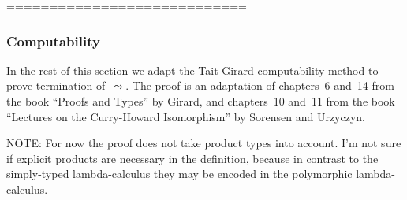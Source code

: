 \documentclass[runningheads,a4paper]{llncs}
\newcommand{\arrtype}{\Rightarrow}
\newcommand{\arreta}{\leadsto_\eta}
\newcommand{\arrnormalise}{\leadsto}
\newcommand{\normstep}{\leadsto_\mu}
\newcommand{\abs}[2]{\lambda #1.#2}
\newcommand{\app}[2]{#1 \cdot #2}
\newcommand{\apps}[3]{#1 \cdot #2 \cdots #3}
\newcommand{\nat}{\mathtt{nat}}
\newcommand{\SN}{\mathrm{SN}}
\newcommand{\Nbb}{\mathbb{N}}
\newcommand{\proves}{\vdash}
\begin{document}
%
%

============================


\subsubsection{Computability}
In the rest of this section we adapt the Tait-Girard computability
method to prove termination of~$\arrnormalise$. The proof is an
adaptation of chapters~6 and~14 from the book ``Proofs and Types'' by
Girard, and chapters~10 and~11 from the book ``Lectures on the
Curry-Howard Isomorphism'' by Sorensen and Urzyczyn.

NOTE: For now the proof does not take product types into account. I'm
not sure if explicit products are necessary in the definition, because
in contrast to the simply-typed lambda-calculus they may be encoded in
the polymorphic lambda-calculus.
\end{document}
